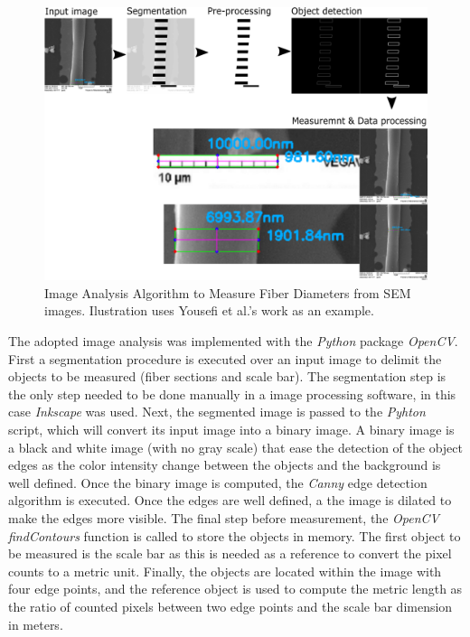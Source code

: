 \begin{figure}[!th]
\centering
\includegraphics[scale=0.50]{./Figures/imageAnalysisAlgorithm.png}
\decoRule
\caption[Image Analysis Algorithm to Measure Fiber Diameters from SEM images]{Image Analysis Algorithm to Measure Fiber Diameters from SEM images. Ilustration uses Yousefi et al.'s work as an example. \cite{Yousefi2019}}
\label{fig:imageAnalysisAlgorithm}
\end{figure}

The adopted image analysis was implemented with the \emph{Python} package \emph{OpenCV}. First a segmentation procedure is executed over an input image to delimit the objects to be measured (fiber sections and scale bar). The segmentation step is the only step needed to be done manually in a image processing software, in this case \emph{Inkscape} was used. Next, the segmented image is passed to the \emph{Pyhton} script, which will convert its input image into a binary image. A binary image is a black and white image (with no gray scale) that ease the detection of the object edges as the color intensity change between the objects and the background is well defined. Once the binary image is computed, the \emph{Canny} edge detection algorithm is executed. Once the edges are well defined, a the image is dilated to make the edges more visible. The final step before measurement, the \emph{OpenCV} \emph{findContours} function is called to store the objects in memory. The first object to be measured is the scale bar as this is needed as a reference to convert the pixel counts to a metric unit. Finally, the objects are located within the image with four edge points, and the reference object is used to compute the metric length as the ratio of counted pixels between two edge points and the scale bar dimension in meters.

